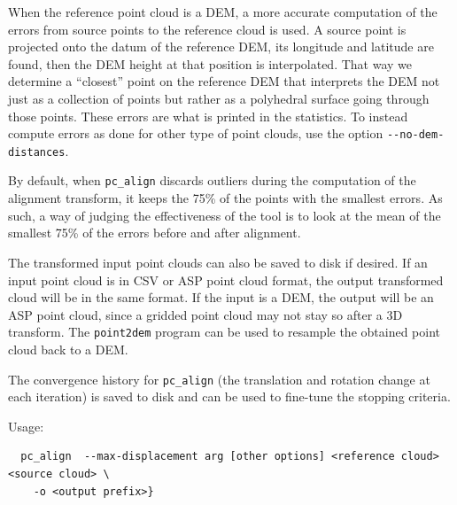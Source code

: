 When the reference point cloud is a DEM, a more accurate computation of
the errors from source points to the reference cloud is used. A source
point is projected onto the datum of the reference DEM, its longitude
and latitude are found, then the DEM height at that position is
interpolated.  That way we determine a ``closest'' point on the
reference DEM that interprets the DEM not just as a collection of points
but rather as a polyhedral surface going through those points. These
errors are what is printed in the statistics. To instead compute
errors as done for other type of point clouds, use the option
\texttt{-\/-no-dem-distances}.

By default, when \texttt{pc\_align} discards outliers during the
computation of the alignment transform, it keeps the 75\% of the points
with the smallest errors. As such, a way of judging the effectiveness of
the tool is to look at the mean of the smallest 75\% of the errors
before and after alignment.

The transformed input point clouds can also be saved to disk if
desired. If an input point cloud is in CSV or ASP point cloud format,
the output transformed cloud will be in the same format. If the input is
a DEM, the output will be an ASP point cloud, since a gridded point
cloud may not stay so after a 3D transform. The \texttt{point2dem}
program can be used to resample the obtained point cloud back to a DEM.

The convergence history for \texttt{pc\_align} (the translation and
rotation change at each iteration) is saved to disk and can be used to
fine-tune the stopping criteria.

\medskip

Usage:\\
\begin{verbatim}
  pc_align  --max-displacement arg [other options] <reference cloud> <source cloud> \
    -o <output prefix>}
\end{verbatim}

\medskip

